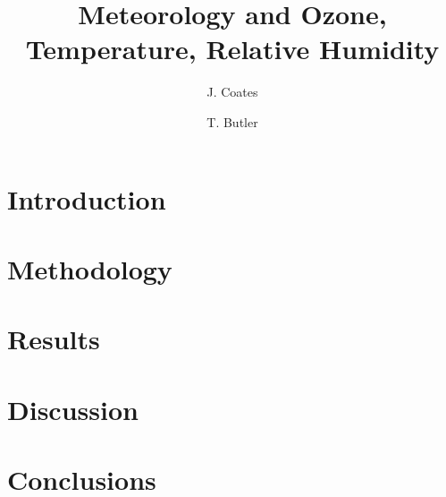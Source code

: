 \documentclass[11pt,a4paper]{article}
\title{Meteorology and Ozone, Temperature, Relative Humidity}
\author[1]{J. Coates}
\author[1]{T. Butler}
\affil[1]{Institute for Advanced Sustainability Studies, Potsdam, Germany}
\begin{document}
\maketitle

\begin{abstract}
\end{abstract}

\section{Introduction} \label{s:introduction}


\section{Methodology} \label{s:methodology}


\section{Results} \label{s:results}


\section{Discussion} \label{s:discussion}


\section{Conclusions} \label{s:conclusions}
%


 
\end{document}

